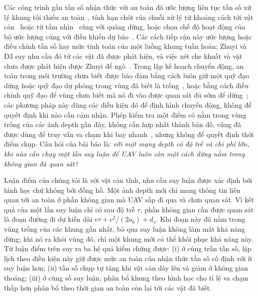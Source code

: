 \documentclass[11pt,a4paper]{article}
\theoremstyle{plain}
\theoremstyle{definition}
\theoremstyle{remark}
\begin{document}
Các công trình gắn tần số nhận thức với an toàn đã ước lượng liên tục tần số xử lý khung tối thiểu an toàn~\cite{hsiao2022}, tính hạn chót của chuỗi xử lý từ khoảng cách tới vật cản~\cite{gog2022} hoặc từ tầm nhìn~\cite{boroujerdian2021} cùng với quãng dừng, hoặc chọn chế độ hoạt động của bộ ước lượng cùng với điều khiển dự báo~\cite{pant2021}. Các cách tiếp cận này ước lượng hoặc điều chỉnh tần số hay mức tính toán của một luồng khung tuần hoàn; Zhuyi và D3 suy nhu cầu đó từ các vật đã được phát hiện, và việc xét che khuất và vật chưa được phát hiện được Zhuyi để ngỏ~\cite{hsiao2022}. Trong lập kế hoạch chuyển động, an toàn trong môi trường chưa biết được bảo đảm bằng cách luôn giữ một quỹ đạo dừng hoặc quỹ đạo dự phòng trong vùng đã biết là trống~\cite{liu2016,tordesillas2021}, hoặc bằng cách điều chỉnh quỹ đạo để vùng chưa biết mà nó đi vào được quan sát đủ sớm để dừng~\cite{zhou2021}; các phương pháp này dùng các điều kiện đó để định hình chuyển động, không để quyết định khi nào cần cảm nhận. Phép kiểm tra một điểm có nằm trong vùng trống của các ảnh depth gần đây, không cần hợp nhất thành bản đồ, cũng đã được dùng để truy vấn va chạm khi bay nhanh~\cite{florence2018}, nhưng không để quyết định thời điểm chụp. Câu hỏi của bài báo là: \emph{với một mạng depth có độ trễ và chi phí lớn, khi nào cần chạy một lần suy luận để UAV luôn còn một cách dừng nằm trong không gian đã quan sát?}

Luận điểm của chúng tôi là với vật cản tĩnh, nhu cầu suy luận được xác định bởi hình học chứ không bởi đồng hồ. Một ảnh depth mới chỉ mang thông tin liên quan tới an toàn ở phần không gian mà UAV sắp đi qua và chưa quan sát. Vì kết quả của một lần suy luận chỉ có sau độ trễ $\tau$, phần không gian cần được quan sát là đoạn đường đi dự kiến dài $v\tau + v^2/(2a_b) + d_s$. Khi đoạn này đã nằm trong vùng trống của các khung gần nhất, bỏ qua suy luận không làm mất khả năng dừng; khi nó ra khỏi vùng đó, chỉ một khung mới có thể khôi phục khả năng này. Từ luận điểm trên suy ra ba hệ quả kiểm chứng được: (i) ở cùng trần tần số, lập lịch theo điều kiện này giữ được mức an toàn của nhận thức tần số cố định với ít suy luận hơn; (ii) tần số chụp tự tăng khi vật cản dày lên và giảm ở không gian thoáng; (iii) ở cùng số suy luận, phân bổ khung theo hình học cho tỉ lệ va chạm thấp hơn phân bổ theo thời gian an toàn còn lại tới các vật đã biết.
\end{document}
